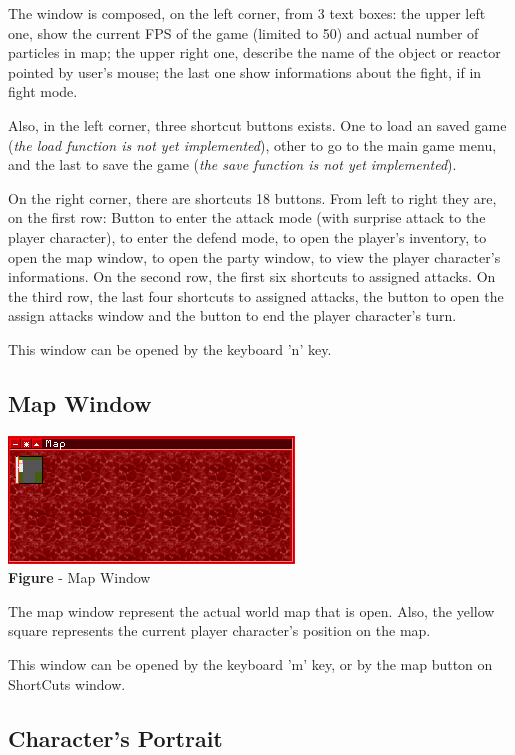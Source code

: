 \documentclass[ letterpaper,12pt]{article}
\begin{document}
The window is composed, on the left corner, from 3 text boxes: the upper left one, show the current FPS of the game (limited to 50) and actual number of particles in map; the upper right one, describe the name of the object or reactor pointed by user's mouse; the last one show informations about the fight, if in fight mode.

Also, in the left corner, three shortcut buttons exists. One to load an saved game ({\it the load function is not yet implemented}), other to go to the main game menu, and the last to save the game ({\it the save function is not yet implemented}).

On the right corner, there are shortcuts 18 buttons. From left to right they are, on the first row: Button to enter the attack mode (with surprise attack to the player character), to enter the defend mode, to open the player's inventory, to open the map window, to open the party window, to view the player character's informations. On the second row, the first six shortcuts to assigned attacks. On the third row, the last four shortcuts to assigned attacks, the button to open the assign attacks window and the button to end the player character's turn.

This window can be opened by the keyboard 'n' key.

\subsection{Map Window}

\begin{center}
  \includegraphics{mapWindow.png}
\\{\bf Figure} - Map Window
\end{center}

The map window represent the actual world map that is open. Also, the yellow square represents the current player character's position on the map. 

This window can be opened by the keyboard 'm' key, or by the map button on ShortCuts window.

\subsection{Character's Portrait}
\end{document}
